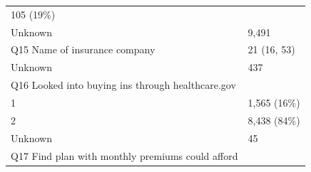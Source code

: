 \documentclass[]{article}
\begin{document}
\begin{longtable}[]{@{}ll@{}}
\begin{minipage}[t]{0.23\columnwidth}
105 (19\%)\strut
\end{minipage}\tabularnewline
\begin{minipage}[t]{0.71\columnwidth}\raggedright
Unknown\strut
\end{minipage} & \begin{minipage}[t]{0.23\columnwidth}\raggedright
9,491\strut
\end{minipage}\tabularnewline
\begin{minipage}[t]{0.71\columnwidth}\raggedright
Q15 Name of insurance company\strut
\end{minipage} & \begin{minipage}[t]{0.23\columnwidth}\raggedright
21 (16, 53)\strut
\end{minipage}\tabularnewline
\begin{minipage}[t]{0.71\columnwidth}\raggedright
Unknown\strut
\end{minipage} & \begin{minipage}[t]{0.23\columnwidth}\raggedright
437\strut
\end{minipage}\tabularnewline
\begin{minipage}[t]{0.71\columnwidth}\raggedright
Q16 Looked into buying ins through healthcare.gov\strut
\end{minipage} & \begin{minipage}[t]{0.23\columnwidth}\raggedright
\strut
\end{minipage}\tabularnewline
\begin{minipage}[t]{0.71\columnwidth}\raggedright
1\strut
\end{minipage} & \begin{minipage}[t]{0.23\columnwidth}\raggedright
1,565 (16\%)\strut
\end{minipage}\tabularnewline
\begin{minipage}[t]{0.71\columnwidth}\raggedright
2\strut
\end{minipage} & \begin{minipage}[t]{0.23\columnwidth}\raggedright
8,438 (84\%)\strut
\end{minipage}\tabularnewline
\begin{minipage}[t]{0.71\columnwidth}\raggedright
Unknown\strut
\end{minipage} & \begin{minipage}[t]{0.23\columnwidth}\raggedright
45\strut
\end{minipage}\tabularnewline
\begin{minipage}[t]{0.71\columnwidth}\raggedright
Q17 Find plan with monthly premiums could afford\strut

\end{minipage}
\end{longtable}
\end{document}
